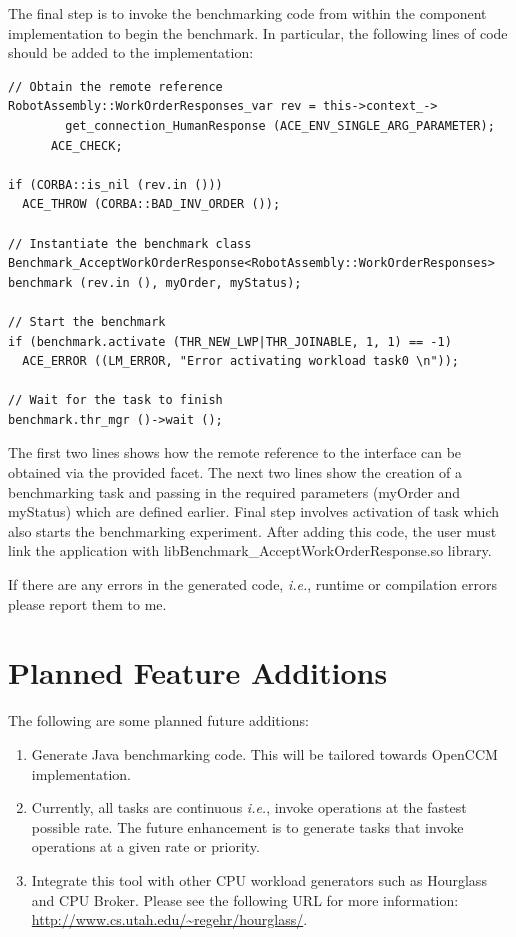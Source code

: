 \documentclass[onecolumn]{article}
\begin{document}
The final step is to invoke the benchmarking code from within the
component implementation to begin the benchmark. In particular, the
following lines of code should be added to the implementation:

{
\footnotesize

\begin{verbatim}
// Obtain the remote reference
RobotAssembly::WorkOrderResponses_var rev = this->context_->
        get_connection_HumanResponse (ACE_ENV_SINGLE_ARG_PARAMETER);
      ACE_CHECK;

if (CORBA::is_nil (rev.in ()))
  ACE_THROW (CORBA::BAD_INV_ORDER ());

// Instantiate the benchmark class
Benchmark_AcceptWorkOrderResponse<RobotAssembly::WorkOrderResponses>
benchmark (rev.in (), myOrder, myStatus);

// Start the benchmark
if (benchmark.activate (THR_NEW_LWP|THR_JOINABLE, 1, 1) == -1)
  ACE_ERROR ((LM_ERROR, "Error activating workload task0 \n"));

// Wait for the task to finish
benchmark.thr_mgr ()->wait ();

\end{verbatim}
}

The first two lines shows how the remote reference to the interface
can be obtained via the provided facet. The next two lines show the
creation of a benchmarking task and passing in the required parameters
(myOrder and myStatus) which are defined earlier. Final step involves
activation of task which also starts the benchmarking experiment.
After adding this code, the user must link the application with
libBenchmark\_AcceptWorkOrderResponse.so library.

If there are any errors in the generated code, {\em i.e.}, runtime or
compilation errors please report them to me. 

\section* {Planned Feature Additions}
The following are some planned future additions:
\begin{enumerate}

\item Generate Java benchmarking code. This will be tailored towards
OpenCCM implementation.

\item Currently, all tasks are continuous {\em i.e.}, invoke operations at
the fastest possible rate. The future enhancement is to generate tasks
that invoke operations at a given rate or priority.

\item Integrate this tool with other CPU workload generators such as
Hourglass and CPU Broker. Please see the following URL for more
information: \url{http://www.cs.utah.edu/~regehr/hourglass/}.
\end{enumerate}
\end{document}
